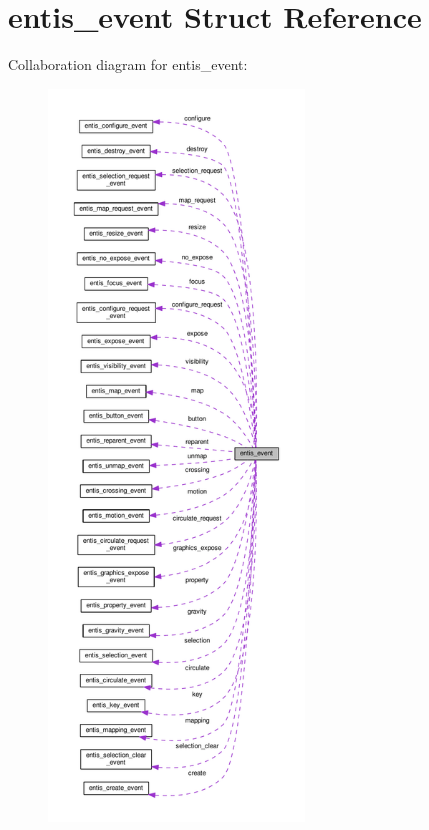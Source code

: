 \hypertarget{structentis__event}{}\section{entis\+\_\+event Struct Reference}
\label{structentis__event}


Collaboration diagram for entis\+\_\+event\+:\nopagebreak
\begin{figure}[H]
\begin{center}
\leavevmode
\includegraphics[height=550pt]{structentis__event__coll__graph}
\end{center}
\end{figure}

